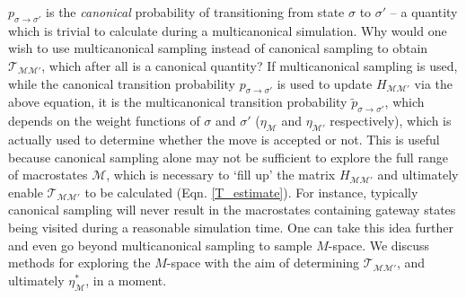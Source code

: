 \documentclass{report}
\begin{document}
$p_{\sigma\to\sigma'}$ is the \emph{canonical} probability of transitioning from state $\sigma$ to $\sigma'$ -- a quantity which is trivial to calculate
during a multicanonical simulation.
Why would one wish to use multicanonical sampling instead of canonical sampling to obtain $\mathcal{T}_{\mathcal{MM}'}$, which after all is a canonical
quantity? If multicanonical sampling is used, while the canonical transition probability $p_{\sigma\to\sigma'}$ is used to update $H_{\mathcal{M}\mathcal{M}'}$
via the above equation, it is the multicanonical transition probability $\tilde{p}_{\sigma\to\sigma'}$, which depends on the weight functions of
$\sigma$ and $\sigma'$ ($\eta_{\mathcal{M}}$ and $\eta_{\mathcal{M}'}$ respectively), which is actually used to determine whether the move is accepted or not.
This is useful because canonical sampling alone may not be sufficient to explore the full range of macrostates $\mathcal{M}$, which is necessary to 
`fill up' the matrix $H_{\mathcal{M}\mathcal{M}'}$ and ultimately enable $\mathcal{T}_{\mathcal{M}\mathcal{M}'}$ to be calculated (Eqn. \eqref{T_estimate}). 
For instance, typically canonical sampling will never result in the macrostates containing gateway states being visited during a reasonable simulation
time.
One can take this idea further and even go beyond multicanonical sampling to sample $M$-space. We discuss methods for exploring the $M$-space
with the aim of determining $\mathcal{T}_{\mathcal{MM}'}$, and ultimately $\eta_{\mathcal{M}}^*$, in a moment.
\end{document}
